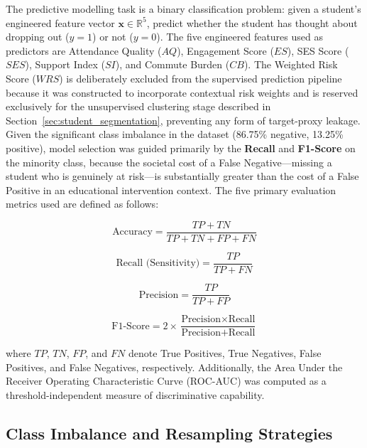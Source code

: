 The predictive modelling task is a binary classification problem: given a student's engineered feature vector $\mathbf{x} \in \mathbb{R}^{5}$, predict whether the student has thought about dropping out ($y = 1$) or not ($y = 0$). The five engineered features used as predictors are Attendance Quality ($AQ$), Engagement Score ($ES$), SES Score ($SES$), Support Index ($SI$), and Commute Burden ($CB$). The Weighted Risk Score ($WRS$) is deliberately excluded from the supervised prediction pipeline because it was constructed to incorporate contextual risk weights and is reserved exclusively for the unsupervised clustering stage described in Section~\ref{sec:student_segmentation}, preventing any form of target-proxy leakage. Given the significant class imbalance in the dataset (86.75\% negative, 13.25\% positive), model selection was guided primarily by the \textbf{Recall} and \textbf{F1-Score} on the minority class, because the societal cost of a False Negative---missing a student who is genuinely at risk---is substantially greater than the cost of a False Positive in an educational intervention context. The five primary evaluation metrics used are defined as follows:

\begin{equation}
    \text{Accuracy} = \frac{TP + TN}{TP + TN + FP + FN}
    \label{eq:accuracy}
\end{equation}

\begin{equation}
    \text{Recall (Sensitivity)} = \frac{TP}{TP + FN}
    \label{eq:recall}
\end{equation}

\begin{equation}
    \text{Precision} = \frac{TP}{TP + FP}
    \label{eq:precision}
\end{equation}

\begin{equation}
    \text{F1-Score} = 2 \times \frac{\text{Precision} \times \text{Recall}}{\text{Precision} + \text{Recall}}
    \label{eq:f1}
\end{equation}

where $TP$, $TN$, $FP$, and $FN$ denote True Positives, True Negatives, False Positives, and False Negatives, respectively. Additionally, the Area Under the Receiver Operating Characteristic Curve (ROC-AUC) was computed as a threshold-independent measure of discriminative capability.

\subsection{Class Imbalance and Resampling Strategies}
\label{subsec:resampling}

